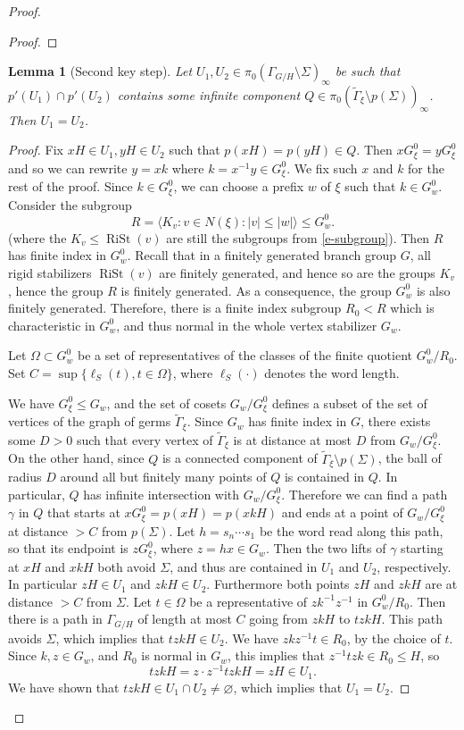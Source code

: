 \documentclass[11pt]{amsart}
\newcommand{\rist}{\ensuremath{\operatorname{RiSt}}}%
\newcommand{\Gammatilde}{\ensuremath{\widetilde{\Gamma}}}%
\theoremstyle{definition}
\theoremstyle{plain}
\newtheorem{main thm}{Theorem}
\newtheorem{lemma}[defin]{Lemma}
\theoremstyle{remark}
\theoremstyle{plain}
\begin{document}
\begin{proof}
\begin{proof}
    
\end{proof}

\begin{lemma}[Second key step] \label{l-ends-injection}
    Let $U_1, U_2\in \pi_0(\Gamma_{G/H}\setminus\Sigma)_\infty$ be such that $p'(U_1)\cap p'(U_2)$ contains some infinite component $Q\in \pi_0(\Gammatilde_\xi\setminus p(\Sigma))_\infty$. Then $U_1=U_2$.
\end{lemma}
\begin{proof}
    Fix $xH\in U_1, yH\in U_2$ such that $p(xH)=p(yH)\in Q$. Then $xG^0_\xi=yG^0_\xi$ and so we can rewrite $y=xk$ where $k=x^{-1}y\in G^0_\xi$. We fix such $x$ and $k$ for the rest of the proof. Since $k\in G^0_\xi$, we can choose a prefix $w$ of $\xi$ such that $k\in G_w^0$. Consider the subgroup
\[R=\langle K_v \colon v\in N(\xi) \colon |v|\le |w|\rangle\le G_w^0.\]
(where the $K_v\leq \rist(v)$ are still the subgroups from \eqref{e-subgroup}). Then $R$ has finite index in $G_w^0$.  Recall that in a finitely generated branch group $G$, all rigid stabilizers $\rist(v)$ are finitely generated, and hence so are the groups $K_v$, hence the group $R$ is finitely generated. As a consequence, the group  $G_w^0$ is also finitely generated. Therefore, there is a finite index subgroup $R_0<R$ which is characteristic in $G_w^0$, and thus normal in the whole vertex stabilizer $G_w$.

Let $\Omega\subset G_w^0$ be a set of representatives of the classes of the finite quotient $G_w^0/R_0$. Set $C=\sup\{\ell_S(t), t\in \Omega\}$, where $\ell_S(\cdot)$ denotes the word length.

We have $G^0_\xi\le G_w$, and the set of cosets $G_w/G^0_\xi$ defines a subset of the set of vertices  of the graph of germs $\Gammatilde_\xi$. Since $G_w$ has finite index in $G$, there exists some $D>0$ such that every vertex of $\Gammatilde_\xi$ is at distance at most $D$ from $G_w/G^0_\xi$. On the other hand, since $Q$ is a connected component of $\Gammatilde_\xi \setminus p(\Sigma)$, the ball of radius $D$ around all but finitely many points of $Q$ is contained in $Q$. In particular, $Q$ has infinite intersection with $G_w/G^0_\xi$.  Therefore we can find a path $\gamma$ in $Q$ that starts at $xG_\xi^0=p(xH)=p(xkH)$ and ends at  a point  of $G_w/G^0_\xi$ at distance $>C$ from $p(\Sigma)$. Let $h=s_n\cdots s_1$ be the word read along this path, so that its endpoint is $zG_\xi^0$, where $z=hx\in G_w$. Then the two lifts of $\gamma$ starting at $xH$ and $xkH$ both avoid $\Sigma$, and thus are contained in $U_1$ and $U_2$, respectively. In particular $zH\in U_1$ and $zkH\in U_2$.  Furthermore both points $zH$ and $zkH$ are at distance $>C$ from $\Sigma$. Let $t\in \Omega$ be a representative of $zk^{-1}z^{-1}$ in $G_w^0/R_0$. Then there is a path in $\Gamma_{G/H}$ of length at most $C$ going from $zkH$ to $tzkH$. This path avoids $\Sigma$, which implies that $tzkH\in U_2$. We have $zkz^{-1}t\in R_0$, by the choice of $t$. Since $k, z\in G_w$, and $R_0$ is normal in $G_w$, this implies that $z^{-1}tzk\in R_0\le H$, so
\[tzkH=z\cdot z^{-1}tzkH=zH\in U_1.\]
We have shown that $tzkH\in U_1\cap U_2\neq \varnothing$,
which implies that $U_1=U_2$. \qedhere
    

\end{proof}
\end{proof}
\end{document}
